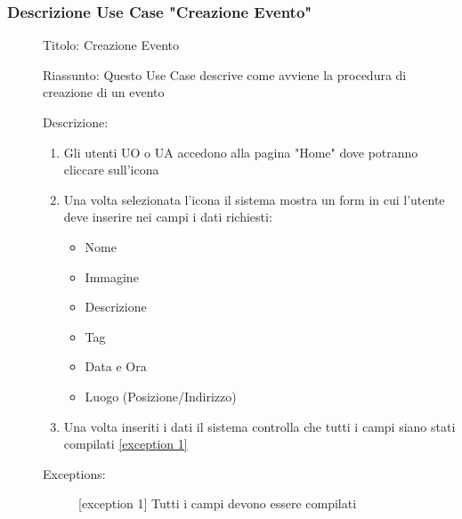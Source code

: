 \documentclass{article}
\begin{document}
\subsubsection*{Descrizione Use Case "Creazione Evento"}
\begin{description}
    \item[] Titolo: Creazione Evento
    \item[] Riassunto: Questo Use Case descrive come avviene la procedura di creazione di un evento
    \item[] Descrizione:
        \begin{enumerate}
            \item Gli utenti UO o UA accedono alla pagina "Home" dove potranno cliccare sull'icona 
            \item Una volta selezionata l'icona il sistema mostra un form in cui l'utente deve inserire nei campi i dati richiesti:
                  \begin{itemize}
                      \item Nome
                      \item Immagine
                      \item Descrizione
                      \item Tag
                      \item Data e Ora
                      \item Luogo (Posizione/Indirizzo)
                  \end{itemize}
            \item Una volta inseriti i dati il sistema controlla che tutti i campi siano stati compilati \hyperref[exc:5.1]{[exception 1]}
        \end{enumerate}
    \item[] Exceptions:
        \begin{description}
            \item[] \label{exc:5.1} [exception 1] Tutti i campi devono essere compilati
        \end{description}
\end{description}
\end{document}
